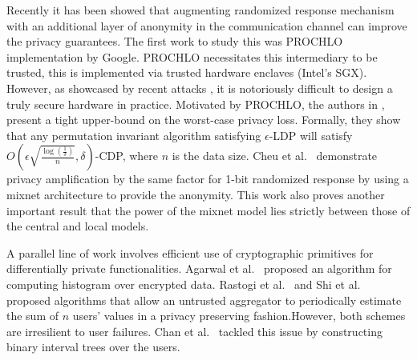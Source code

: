 Recently it has been showed that augmenting randomized response mechanism with an additional layer of anonymity in the communication channel can improve the privacy guarantees. The first work to study this was PROCHLO~\cite{Prochlo} implementation by Google.
PROCHLO necessitates this intermediary to be trusted, this is implemented via trusted hardware enclaves (Intel's SGX). However, as showcased by recent attacks \cite{Foreshadow}, it is notoriously difficult to design a  truly secure hardware in practice. Motivated by PROCHLO, the authors in \cite{amplification}, present a tight upper-bound on the worst-case privacy loss. Formally, they show that  any permutation invariant algorithm satisfying $\epsilon$-\textsf{LDP} will satisfy $O(\epsilon\sqrt{\frac{\log(\frac{1}{\delta})}{n}},\delta)$-\textsf{CDP}, where $n$ is the data size. Cheu et al.~\cite{mixnets} demonstrate privacy amplification by the same factor for 1-bit randomized response by using a mixnet architecture to provide the anonymity. This work also proves another important result that the power of the mixnet model lies strictly between those of the central and local models.

A parallel line of work involves efficient use of cryptographic primitives for differentially private
functionalities.  Agarwal et al.~\cite{kamara} proposed an algorithm for computing histogram over encrypted data. Rastogi et al.~\cite{Rastogi} and Shi et al.~\cite{Shi} proposed algorithms that allow an untrusted aggregator to periodically estimate the sum of $n$ users' values in a  privacy preserving fashion.However, both schemes are irresilient to user failures. Chan et al.~\cite{Shi2} tackled this issue by constructing binary interval trees over the users.

